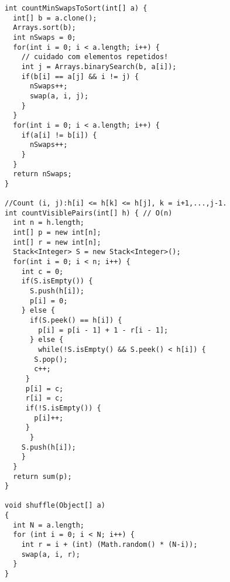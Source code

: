 \begin{lstlisting}
int countMinSwapsToSort(int[] a) {
  int[] b = a.clone();
  Arrays.sort(b);
  int nSwaps = 0;
  for(int i = 0; i < a.length; i++) {
    // cuidado com elementos repetidos!
    int j = Arrays.binarySearch(b, a[i]);
    if(b[i] == a[j] && i != j) {
      nSwaps++;
      swap(a, i, j);
    }
  }
  for(int i = 0; i < a.length; i++) {
    if(a[i] != b[i]) {
      nSwaps++;
    }
  }
  return nSwaps;
}

//Count (i, j):h[i] <= h[k] <= h[j], k = i+1,...,j-1.
int countVisiblePairs(int[] h) { // O(n) 
  int n = h.length;
  int[] p = new int[n];
  int[] r = new int[n];
  Stack<Integer> S = new Stack<Integer>();
  for(int i = 0; i < n; i++) {
    int c = 0;
    if(S.isEmpty()) {
      S.push(h[i]);
      p[i] = 0;
    } else {
      if(S.peek() == h[i]) {
        p[i] = p[i - 1] + 1 - r[i - 1];
      } else {
        while(!S.isEmpty() && S.peek() < h[i]) {
	   S.pop();
	   c++;
	 }
	 p[i] = c;
	 r[i] = c;
	 if(!S.isEmpty()) {
	   p[i]++;
	 }
      }
    S.push(h[i]);
    }
  }
  return sum(p);
}

void shuffle(Object[] a)
{
  int N = a.length;
  for (int i = 0; i < N; i++) {
    int r = i + (int) (Math.random() * (N-i));
    swap(a, i, r);
  }
}
\end{lstlisting}
